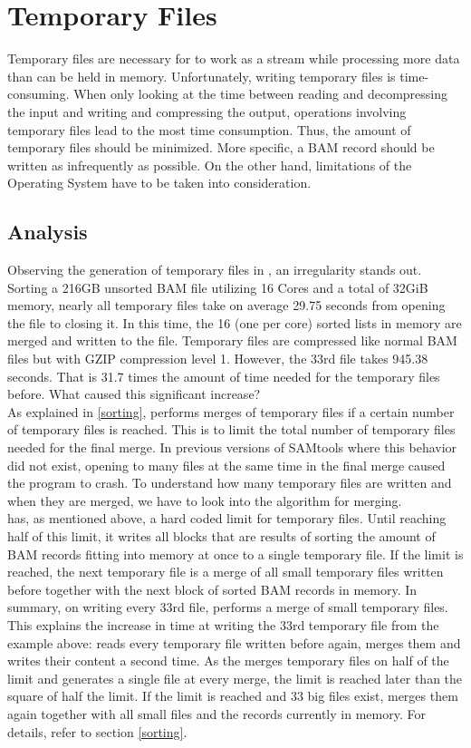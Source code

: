 \section{Temporary Files} 

Temporary files are necessary for \sort to work as a stream while processing more data than can be held in memory. Unfortunately, writing temporary files is time-consuming. When only looking at the time between reading and decompressing the input and writing and compressing the output, operations involving temporary files lead to the most time consumption. Thus, the amount of temporary files should be minimized. More specific, a BAM record should be written as infrequently as possible. On the other hand, limitations of the Operating System have to be taken into consideration.

\subsection{Analysis}
Observing the generation of temporary files in \sort, an irregularity stands out. Sorting a 216GB unsorted BAM file utilizing 16 Cores and a total of 32GiB memory, nearly all temporary files take on average 29.75 seconds from opening the file to closing it. In this time, the 16 (one per core) sorted lists in memory are merged and written to the file. Temporary files are compressed like normal BAM files but with GZIP compression level 1. However, the 33rd file takes 945.38 seconds. That is 31.7 times the amount of time needed for the temporary files before. What caused this significant increase? \\
As explained in \ref{sorting}, \sort performs merges of temporary files if a certain number of temporary files is reached. This is to limit the total number of temporary files needed for the final merge. In previous versions of SAMtools where this behavior did not exist, opening to many files at the same time in the final merge caused the program to crash.
To understand how many temporary files are written and when they are merged, we have to look into the algorithm for merging. \\
\sort has, as mentioned above, a hard coded limit for temporary files. Until reaching half of this limit, it writes all blocks that are results of sorting the amount of BAM records fitting into memory at once to a single temporary file. If the limit is reached, the next temporary file is a merge of all small temporary files written before together with the next block of sorted BAM records in memory. In summary, on writing every 33rd file, \sort performs a merge of small temporary files. This explains the increase in time at writing the 33rd temporary file from the example above: \sort reads every temporary file written before again, merges them and writes their content a second time. As the \sort merges temporary files on half of the limit and generates a single file at every merge, the limit is reached later than the square of half the limit. If the limit is reached and 33 big files exist, \sort merges them again together with all small files and the records currently in memory. For details, refer to section \ref{sorting}. \\
